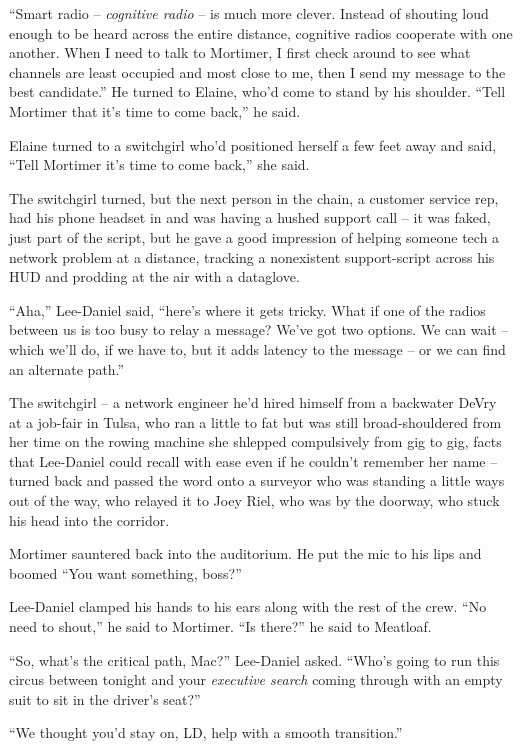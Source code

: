 “Smart radio -- \emph{cognitive radio} -- is much more clever. 
Instead of shouting loud enough to be heard across the entire distance, 
cognitive radios cooperate with one another. When I need to talk to 
Mortimer, I first check around to see what channels are least occupied 
and most close to me, then I send my message to the best candidate.” 
He turned to Elaine, who'd come to stand by his shoulder. “Tell 
Mortimer that it's time to come back,” he said.

Elaine turned to a switchgirl who'd positioned herself a few feet away 
and said, “Tell Mortimer it's time to come back,” she said.

The switchgirl turned, but the next person in the chain, a customer 
service rep, had his phone headset in and was having a hushed support 
call -- it was faked, just part of the script, but he gave a good 
impression of helping someone tech a network problem at a distance, 
tracking a nonexistent support-script across his HUD and prodding at 
the air with a dataglove.

“Aha,” Lee-Daniel said, “here's where it gets tricky. What if one 
of the radios between us is too busy to relay a message? We've got two 
options. We can wait -- which we'll do, if we have to, but it adds 
latency to the message -- or we can find an alternate path.”

The switchgirl -- a network engineer he'd hired himself from a 
backwater DeVry at a job-fair in Tulsa, who ran a little to fat but was 
still broad-shouldered from her time on the rowing machine she shlepped 
compulsively from gig to gig, facts that Lee-Daniel could recall with 
ease even if he couldn't remember her name -- turned back and passed 
the word onto a surveyor who was standing a little ways out of the way, 
who relayed it to Joey Riel, who was by the doorway, who stuck his head 
into the corridor.

Mortimer sauntered back into the auditorium. He put the mic to his lips 
and boomed “You want something, boss?”

Lee-Daniel clamped his hands to his ears along with the rest of the 
crew. “No need to shout,” he said to Mortimer. “Is there?” he 
said to Meatloaf.

\tb

“So, what's the critical path, Mac?” Lee-Daniel asked. “Who's 
going to run this circus between tonight and your \emph{executive 
search} coming through with an empty suit to sit in the driver's 
seat?”

“We thought you'd stay on, LD, help with a smooth transition.”

